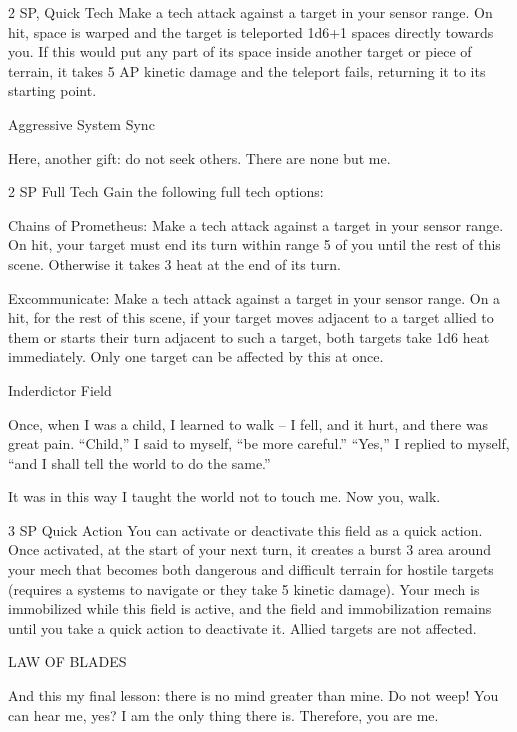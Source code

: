 2 SP, Quick Tech  
 Make a tech attack against a target in your sensor range. On hit, space is warped and the target  
is teleported 1d6+1 spaces directly towards you. If this would put any part of its space inside  
another target or piece of terrain, it takes 5 AP kinetic damage and the teleport fails, returning it  
to its starting point.
 

Aggressive System Sync  

Here, another gift: do not seek others. There are none but me.   

2 SP  
Full Tech  
Gain the following full tech options:
 
         Chains of Prometheus: Make a tech attack against a target in your sensor range. On hit,  
         your target must end its turn within range 5 of you until the rest of this scene. Otherwise it  
         takes 3 heat at the end of its turn.
 
         Excommunicate: Make a tech attack against a target in your sensor range. On a hit, for  
         the rest of this scene, if your target moves adjacent to a target allied to them or starts  
         their turn adjacent to such a target, both targets take 1d6 heat immediately. Only one  
         target can be affected by this at once.  

Inderdictor Field  

Once, when I was a child, I learned to walk  -- I fell, and it hurt, and there was great pain. “Child,” I said to  
myself, “be more careful.” “Yes,” I replied to myself, “and I shall tell the world to do the same.”  

It was in this way I taught the world not to touch me. Now you, walk.   

                                                                                                                  


3 SP  
Quick Action  
You can activate or deactivate this field as a quick action. Once activated, at the start of your  
next turn, it creates a burst 3 area around your mech that becomes both dangerous and difficult  
terrain for hostile targets (requires a systems to navigate or they take 5 kinetic damage). Your  
mech is immobilized while this field is active, and the field and immobilization remains until you  
take a quick action to deactivate it. Allied targets are not affected.
 

LAW OF BLADES  

And this my final lesson: there is no mind greater than mine.   
Do not weep! You can hear me, yes? I am the only thing there is. Therefore, you are me.   

